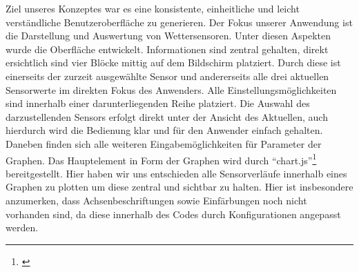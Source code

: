 Ziel unseres Konzeptes war es eine konsistente, einheitliche und leicht verständliche Benutzeroberfläche zu generieren.
Der Fokus unserer Anwendung ist die Darstellung und Auswertung von Wettersensoren. Unter diesen Aspekten wurde die Oberfläche entwickelt.
Informationen sind zentral gehalten, direkt ersichtlich sind vier Blöcke mittig auf dem Bildschirm platziert.
Durch diese ist einerseits der zurzeit ausgewählte Sensor und andererseits alle drei aktuellen Sensorwerte im direkten Fokus des Anwenders.
Alle Einstellungsmöglichkeiten sind innerhalb einer darunterliegenden Reihe platziert.
Die Auswahl des darzustellenden Sensors erfolgt direkt unter der Ansicht des Aktuellen, auch hierdurch wird die Bedienung klar und für den Anwender einfach gehalten.
Daneben finden sich alle weiteren Eingabemöglichkeiten für Parameter der Graphen.
Das Hauptelement in Form der Graphen wird durch \enquote{chart.js}\footnote{\cite{chartjs.2020}} bereitgestellt.
Hier haben wir uns entschieden alle Sensorverläufe innerhalb eines Graphen zu plotten um diese zentral und sichtbar zu halten.
Hier ist insbesondere anzumerken, dass Achsenbeschriftungen sowie Einfärbungen noch nicht vorhanden sind, da diese innerhalb des Codes durch Konfigurationen angepasst werden.

